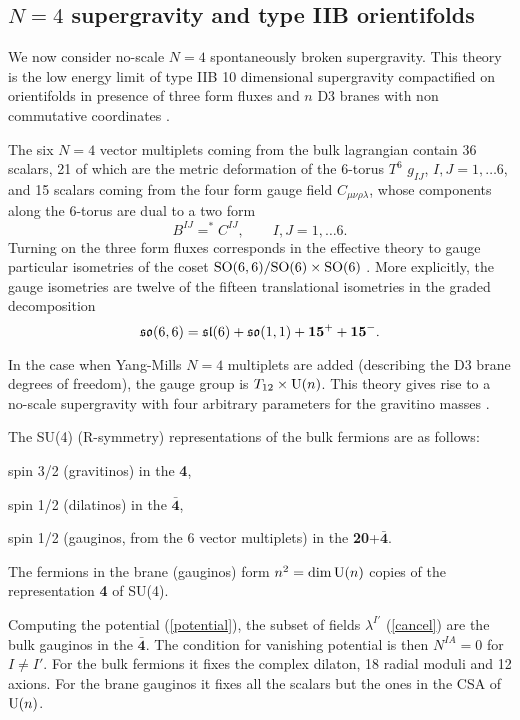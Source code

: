 \documentclass[a4paper,12pt]{article}
\begin{document}
\subsection{$N=4$ supergravity and type IIB orientifolds}

We now consider no-scale $N=4$  spontaneously broken supergravity. This theory is the low energy
limit of
type IIB 10 dimensional supergravity compactified on orientifolds in presence of three form fluxes
and $n$
D3 branes with non commutative coordinates \cite{fp,kst}.

The six $N=4$ vector multiplets coming from the bulk lagrangian
contain 36 scalars,  21 of which are the metric deformation of
the 6-torus $T^6$ $g_{IJ}$, $I,J=1,\dots 6$, and 15 scalars coming
from the four form gauge field $C_{\mu\nu\rho\lambda}$, whose
components along the 6-torus are dual to a two form
$$B^{IJ}=^*\!\!C^{IJ}, \qquad I,J=1,\dots 6.$$ Turning on the
three form fluxes corresponds in the effective theory to gauge
particular isometries of the coset
$\mathrm{SO}(6,6)/\mathrm{SO}(6)\times\mathrm{SO}(6)$ \cite{adfl3}. More explicitly,
the gauge isometries are twelve of the fifteen translational
isometries in the graded decomposition \cite{adfl3}
$$\mathfrak{so}(6,6)=\mathfrak{sl}(6)+\mathfrak{so}(1,1) +{\mathbf{15}^+}+{\mathbf{15}^-}.$$

In the case when  Yang-Mills $N=4$ multiplets are added (describing the D3 brane degrees of freedom),
the
gauge group is $T_{12}\times \mathrm{U}(n)$. This theory gives rise to a no-scale supergravity with four
arbitrary parameters for the gravitino masses \cite{tz}.

The SU(4) (R-symmetry) representations of the bulk fermions are as follows:

\noindent spin 3/2 (gravitinos)  in the {\bf 4},

\noindent spin 1/2 (dilatinos) in the $\bar{\mathbf{4}}$,

\noindent spin 1/2 (gauginos, from the 6 vector multiplets) in the {\bf 20}+$\bar{\mathbf{4}}$.

The fermions in the brane (gauginos) form $n^2=\dim\mathrm{U}(n)$ copies of the representation {\bf 4} of SU(4).


Computing the potential (\ref{potential}), the subset of fields $\lambda^{I'}$ (\ref{cancel}) are the
bulk
gauginos  in the $\bar{\mathbf{4}}$. The condition for vanishing potential \cite{dfv}
is then $N^{IA}=0$ for $I\neq I'$. For the bulk fermions it fixes the complex dilaton, 18 radial
moduli
and 12 axions. For the brane gauginos it fixes all the scalars but the ones in the CSA of $\mathrm{U}(n)$.
\end{document}
